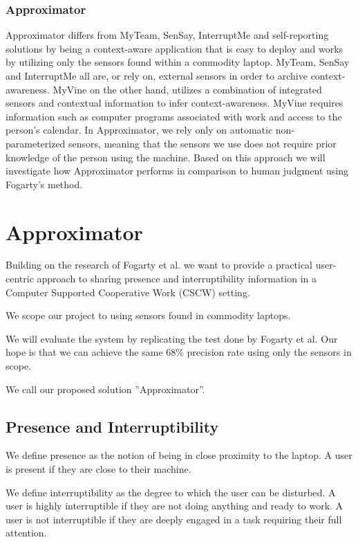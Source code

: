 \documentclass{sigchi}
\begin{document}
\subsubsection{Approximator}
Approximator differs from MyTeam, SenSay, InterruptMe and self-reporting solutions by being a context-aware application that is easy to deploy and works by utilizing only the sensors found within a commodity laptop.
MyTeam, SenSay and InterruptMe all are, or rely on, external sensors in order to archive context-awareness.
MyVine on the other hand, utilizes a combination of integrated sensors and contextual information to infer context-awareness.
MyVine requires information such as computer programs associated with work and access to the person's calendar.
In Approximator, we rely only on automatic non-parameterized sensors, meaning that the sensors we use does not require prior knowledge of the person using the machine.
Based on this approach we will investigate how Approximator performs in comparison to human judgment using Fogarty's method.

\section{Approximator}
Building on the research of Fogarty et al.\cite{fogarty2005predicting} we want to provide a practical user-centric approach to sharing presence and interruptibility information in a Computer Supported Cooperative Work (CSCW) setting.

 We scope our project to using sensors found in commodity laptops.

 We will evaluate the system by replicating the test done by Fogarty et al.
 Our hope is that we can achieve the same 68\% precision rate using only the sensors in scope.

We call our proposed solution ''Approximator''.

\subsection{Presence and Interruptibility}
We define presence as the notion of being in close proximity to the laptop. A user is present if they are close to their machine.

We define interruptibility as the degree to which the user can be disturbed. A user is highly interruptible if they are not doing anything and ready to work. A user is not interruptible if they are deeply engaged in a task requiring their full attention.
\end{document}
